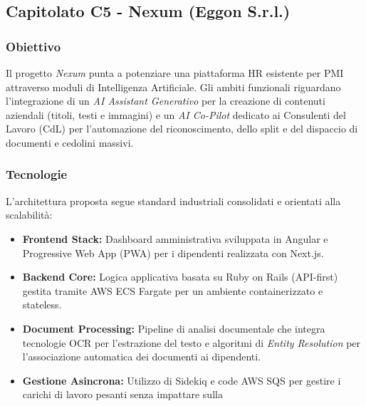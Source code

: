 \documentclass[a4paper, 10pt, colorlinks=true, linkcolor=black, urlcolor=blue, citecolor=blue, hidelinks]{article}
\begin{document}
\subsection{Capitolato C5 - Nexum (Eggon S.r.l.)}

\subsubsection{Obiettivo}
Il progetto \textit{Nexum} punta a potenziare una piattaforma HR esistente per PMI attraverso moduli di Intelligenza Artificiale. Gli ambiti funzionali riguardano l'integrazione di un \textit{AI Assistant Generativo} per la creazione di contenuti aziendali (titoli, testi e immagini) e un \textit{AI Co-Pilot} dedicato ai Consulenti del Lavoro (CdL) per l'automazione del riconoscimento, dello split e del dispaccio di documenti e cedolini massivi.

\subsubsection{Tecnologie}
L'architettura proposta segue standard industriali consolidati e orientati alla scalabilità:
\begin{itemize}
    \item \textbf{Frontend Stack:} Dashboard amministrativa sviluppata in Angular e Progressive Web App (PWA) per i dipendenti realizzata con Next.js.
    \item \textbf{Backend Core:} Logica applicativa basata su Ruby on Rails (API-first) gestita tramite AWS ECS Fargate per un ambiente containerizzato e stateless.
    \item \textbf{Document Processing:} Pipeline di analisi documentale che integra tecnologie OCR per l'estrazione del testo e algoritmi di \textit{Entity Resolution} per l'associazione automatica dei documenti ai dipendenti.
    \item \textbf{Gestione Asincrona:} Utilizzo di Sidekiq e code AWS SQS per gestire i carichi di lavoro pesanti senza impattare sulla
\end{itemize}
\end{document}
